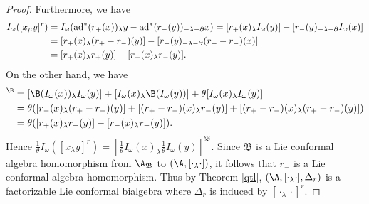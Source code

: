 \documentclass[12pt]{amsart}
\begin{document}
\begin{proof}
Furthermore, we have
\begin{align*}
    I_\omega ([x_\mu y]^r)&=I_\omega ({\rm ad}^*( r_+ (x))_\lambda y -{\rm ad}^*(r_-(y))_{-\lambda-\partial}x)
    =[r_+(x)_\lambda I_\omega(y) ]-[r_-(y)_{-\lambda-\partial} I_\omega(x)]\\
    & = [r_+(x)_\lambda ( r_+-r_-)(y)]-[r_-(y)_{-\lambda-\partial}(r_+-r_-)(x)]\\
    & = [r_+(x)_\lambda r_+(y)]-[r_-(x)_\lambda r_-(y)].
\end{align*}
On the other hand, we have
\begin{align*}
    [I_\omega (x)_\lambda I_\omega(y)]^\B&=[\B( I_\omega (x))_\lambda I_\omega(y) ]+    [I_\omega (x)_\lambda \B(I_\omega(y))]+\theta   [I_\omega (x)_\lambda I_\omega(y)]\\
    & =\theta ( [r_-(x)_\lambda  (r_+-r_-)(y)]+[(r_+-r_-)(x)_\lambda r_-(y)]+[(r_+-r_-)(x)_\lambda (r_+-r_-)(y) ])\\
    & =\theta( [r_+(x)_\lambda r_+(y)]-[r_-(x)_\lambda r_-(y)]).
\end{align*}
Hence $\frac{1}{\theta}I_\omega ([x_\lambda
y]^r)=[\frac{1}{\theta}I_\omega (x)_\lambda
\frac{1}{\theta}I_\omega (y)]^\mathfrak{B}$. Since $\mathfrak{B}$
is a Lie conformal algebra homomorphism from $\A_\mathfrak{B}$ to
$(\A,[\cdot_\lambda\cdot])$, it follows that $r_-$ is a Lie
conformal algebra homomorphism. Thus by Theorem \ref{qtl}, $
(\A,[\cdot_\lambda\cdot],\Delta_r)$ is a factorizable Lie
conformal bialgebra where $\Delta_r$ is induced by
$[\cdot_\lambda\cdot]^r$.
\end{proof}


\end{document}
